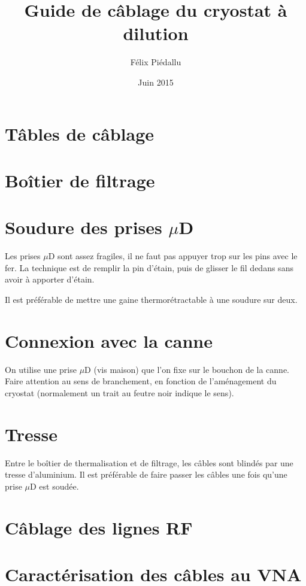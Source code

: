 \documentclass[a4paper,11pt]{article}
\title{Guide de câblage du cryostat à dilution}
\author{Félix Piédallu}
\date{Juin 2015}
\newcommand{\uD}{$\mu$D }
\begin{document}
\maketitle
\tableofcontents

\section{Tâbles de câblage}

\section{Boîtier de filtrage}


\section{Soudure des prises \uD}
Les prises \uD sont assez fragiles, il ne faut pas appuyer trop sur les pins avec le fer. La technique est de remplir la pin d'étain, puis de glisser le fil dedans sans avoir à apporter d'étain.

Il est préférable de mettre une gaine thermorétractable à une soudure sur deux.

\section{Connexion avec la canne}
On utilise une prise \uD (vis maison) que l'on fixe sur le bouchon de la canne. Faire attention au sens de branchement, en fonction de l'aménagement du cryostat (normalement un trait au feutre noir indique le sens).

\section{Tresse}
Entre le boîtier de thermalisation et de filtrage, les câbles sont blindés par une tresse d'aluminium. Il est préférable de faire passer les câbles une fois qu'une prise \uD est soudée.

\section{Câblage des lignes RF}


\section{Caractérisation des câbles au VNA}

\end{document}
